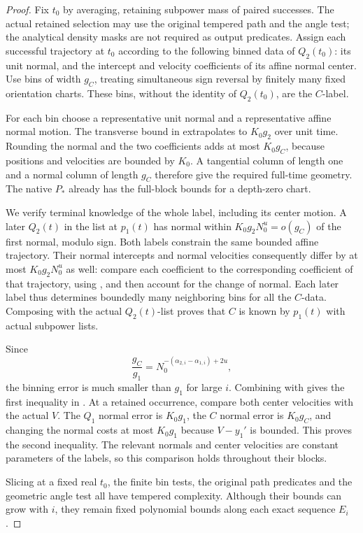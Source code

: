 \begin{proof}
Fix \(t_0\) by averaging, retaining subpower mass of paired successes.
The actual retained selection may use the original tempered path and
the angle test; the analytical density masks are not required as output
predicates.  Assign each successful trajectory at \(t_0\) according to
the following binned data of \(Q_2(t_0)\): its unit normal, and the
intercept and velocity coefficients of its affine normal center.
Use bins of width \(g_C\), treating simultaneous sign reversal by
finitely many fixed orientation charts.  These bins, without the
identity of \(Q_2(t_0)\), are the \(C\)-label.

For each bin choose a representative unit normal and a representative
affine normal motion.  The transverse bound in
 extrapolates to \(K_0g_2\) over unit time.
Rounding the normal and the two coefficients adds at most \(K_0g_C\),
because positions and velocities are bounded by \(K_0\).
A tangential column of length one and a normal column of length \(g_C\)
therefore give the required full-time geometry.  The native \(P_*\)
already has the full-block bounds for a depth-zero chart.

We verify terminal knowledge of the whole label, including its center
motion.  A later \(Q_2(t)\) in the list at \(p_1(t)\) has normal within
\(K_0g_2N_0^u=o(g_C)\) of the first normal, modulo sign.
Both labels constrain the same bounded affine trajectory.  Their
normal intercepts and normal velocities consequently differ by at most
\(K_0g_2N_0^u\) as well: compare each coefficient to the corresponding
coefficient of that trajectory, using
, and then account for the change of normal.
Each later label thus determines boundedly many neighboring bins for
all the \(C\)-data.  Composing with the actual \(Q_2(t)\)-list proves
that \(C\) is known by \(p_1(t)\) with actual subpower lists.

Since
\[
 \frac{g_C}{g_1}
   =N_0^{-(\alpha_{2,i}-\alpha_{1,i})+2u},
\]
the binning error is much smaller than \(g_1\) for large \(i\).
Combining with  gives the first inequality in
.  At a retained occurrence, compare both
center velocities with the actual \(V\).  The \(Q_1\) normal error is
\(K_0g_1\), the \(C\) normal error is \(K_0g_C\), and changing the
normal costs at most \(K_0g_1\) because \(V-y_1'\) is bounded.
This proves the second inequality.  The relevant normals and center
velocities are constant parameters of the labels, so this comparison
holds throughout their blocks.

Slicing at a fixed real \(t_0\), the finite bin tests, the original path
predicates and the geometric angle test all have tempered complexity.
Although their bounds can grow with \(i\), they remain fixed polynomial
bounds along each exact sequence \(E_i\).
\end{proof}

